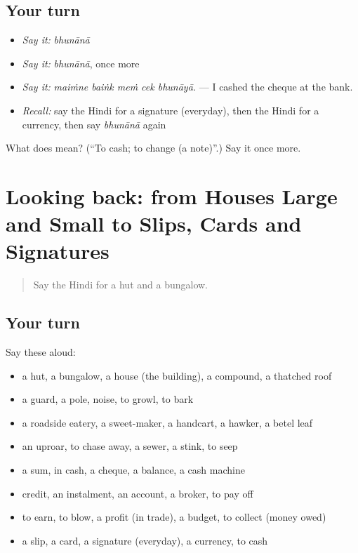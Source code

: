 \subsection*{Your turn}
\begin{itemize}
\raggedright
  \item \emph{Say it:} \emph{bhunānā}
  \item \emph{Say it:} \emph{bhunānā}, once more
  \item \emph{Say it:} \emph{maiṁne baiṅk meṁ cek bhunāyā.} — I cashed the cheque at the bank.
  \item \emph{Recall:} say the Hindi for a signature (everyday), then the Hindi for a currency, then say \emph{bhunānā} again
\end{itemize}

\begin{tcolorbox}[breakable,colback=teal!4,colframe=teal!35!black,title={Before you move on}]
What does  mean? (\textquotedblleft{}To cash; to change (a note)\textquotedblright{}.) Say it once more.
\end{tcolorbox}
\section[(dialogue)]{Looking back: from Houses Large and Small to Slips, Cards and Signatures}

\label{lesson:HI-R429-review-422-429}



\begin{quote}
Say the Hindi for a hut and a bungalow.
\end{quote}

\subsection*{Your turn}
Say these aloud:

\begin{itemize}
\raggedright
  \item a hut, a bungalow, a house (the building), a compound, a thatched roof
  \item a guard, a pole, noise, to growl, to bark
  \item a roadside eatery, a sweet-maker, a handcart, a hawker, a betel leaf
  \item an uproar, to chase away, a sewer, a stink, to seep
  \item a sum, in cash, a cheque, a balance, a cash machine
  \item credit, an instalment, an account, a broker, to pay off
  \item to earn, to blow, a profit (in trade), a budget, to collect (money owed)
  \item a slip, a card, a signature (everyday), a currency, to cash
\end{itemize}


